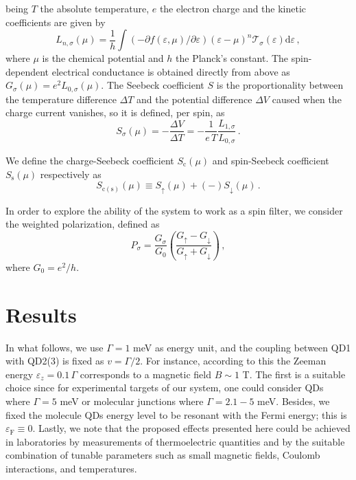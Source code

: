 \documentclass[aps,twocolumn,prb,superscript,floatfix,superscriptaddress,showpacs]{revtex4-1}
\newcommand{\ve}{\varepsilon}
\begin{document}
being $T$ the absolute temperature, $e$ the electron charge and the kinetic coefficients are given by
\begin{equation}
L_{n,\sigma}(\mu)=\frac{1}{h}\int\left(-\partial f(\ve,\mu)/\partial\ve\right)(\ve-\mu)^{n}\mathcal{T}_{\sigma}(\ve)\text{d}\ve\,,
\end{equation}
where $\mu$ is the chemical potential and $h$ the Planck's constant. The spin-dependent electrical conductance is obtained directly from above as $G_{\sigma}(\mu)=e^{2}L_{0,\sigma}(\mu)$. The Seebeck coefficient $S$ is the proportionality between the temperature difference $\Delta T$ and the potential difference $\Delta V$ caused when the charge current vanishes, so it is defined, per spin, as
\begin{equation}
S_{\sigma}(\mu)=-\frac{\Delta V}{\Delta T}=-\frac{1}{e\,T}\frac{L_{1,\sigma}}{L_{0,\sigma}}\,. \label{S}
\end{equation}

We define the charge-Seebeck coefficient $S_{\text{c}}(\mu)$ and spin-Seebeck coefficient $S_{\text{s}}(\mu)$ respectively as\cite{Swirkowicz2009,Czerner2011,Trocha2012,Rameshti2015}
\begin{equation}
S_{\text{c}(\text{s})}(\mu)\equiv S_{\uparrow}(\mu)+(-)S_{\downarrow}(\mu)\,. \label{Scargayespin}
\end{equation}

In order to explore the ability of the system to work as a spin filter, we consider the weighted polarization, defined as
\begin{equation}
P_{\sigma}=\frac{G_{\sigma}}{G_0}\left(\frac{G_{\uparrow}-G_{\downarrow}}{G_{\uparrow}+G_{\downarrow}}\right)\,,
\end{equation}
where $G_0=e^{2}/h$.

\section{Results}\label{secresults}

In what follows, we use $\Gamma=1$ meV as energy unit, and the coupling between QD1 with QD2(3) is fixed as $v=\Gamma/2$. For instance, according to this the Zeeman energy $\ve_{z}=0.1\,\Gamma$ corresponds to a magnetic field $B\sim 1$ T. The first is a suitable choice since for experimental targets of our system, one could consider QDs where $\Gamma=5$ meV\cite{Kobayashi2002} or molecular junctions where $\Gamma=2.1-5$ meV.\cite{Capozzi2016} Besides, we fixed the molecule QDs energy level to be resonant with the Fermi energy; this is $\ve_{\text{F}}\equiv0$. Lastly, we note that the proposed effects presented here could be achieved in laboratories by measurements of thermoelectric quantities\cite{Reddy2007,Widawsky2012,Nichele2015,Dutta2017} and by the suitable combination of tunable parameters such as small magnetic fields,\cite{Nichele2015,Chengyu2017} Coulomb interactions,\cite{Hamo2016} and temperatures.\cite{Chengyu2017,Dutta2017}
\end{document}
